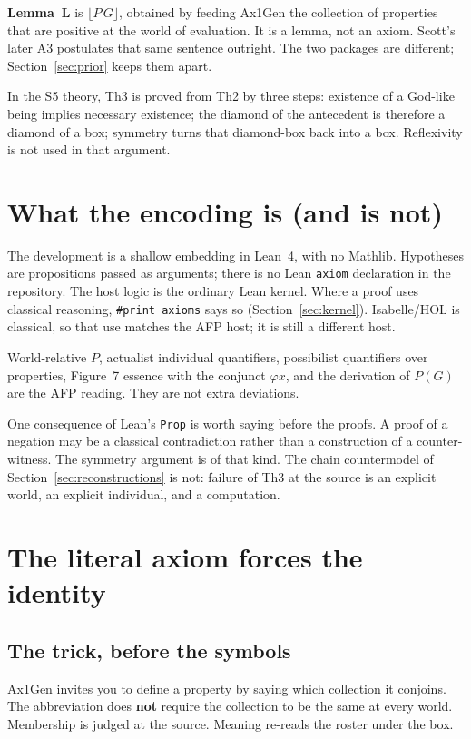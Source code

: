 \documentclass[11pt]{article}
\newcommand{\floor}[1]{\lfloor #1 \rfloor}
\begin{document}
\textbf{Lemma~L} is \(\floor{P\,G}\), obtained by feeding Ax1Gen the collection of
properties that are positive at the world of evaluation. It is a lemma, not an axiom.
Scott's later A3 postulates that same sentence outright. The two packages are different;
Section~\ref{sec:prior} keeps them apart.

In the S5 theory, Th3 is proved from Th2 by three steps: existence of a God-like being
implies necessary existence; the diamond of the antecedent is therefore a diamond of a
box; symmetry turns that diamond-box back into a box. Reflexivity is not used in that
argument.

\section{What the encoding is (and is not)}

The development is a shallow embedding in Lean~4, with no Mathlib. Hypotheses are
propositions passed as arguments; there is no Lean \texttt{axiom} declaration in the
repository. The host logic is the ordinary Lean kernel. Where a proof uses classical
reasoning, \texttt{\#print axioms} says so (Section~\ref{sec:kernel}). Isabelle/HOL is
classical, so that use matches the AFP host; it is still a different host.

World-relative \(P\), actualist individual quantifiers, possibilist quantifiers over
properties, Figure~7 essence with the conjunct \(\varphi x\), and the derivation of
\(P(G)\) are the AFP reading. They are not extra deviations.

One consequence of Lean's \texttt{Prop} is worth saying before the proofs. A proof of a
negation may be a classical contradiction rather than a construction of a counter-witness.
The symmetry argument is of that kind. The chain countermodel of Section~\ref{sec:reconstructions}
is not: failure of Th3 at the source is an explicit world, an explicit individual, and a
computation.

\section{The literal axiom forces the identity}
\label{sec:literal}

\subsection{The trick, before the symbols}

Ax1Gen invites you to define a property by saying which collection it conjoins. The
abbreviation does \textbf{not} require the collection to be the same at every world.
Membership is judged at the source. Meaning re-reads the roster under the box.
\end{document}
